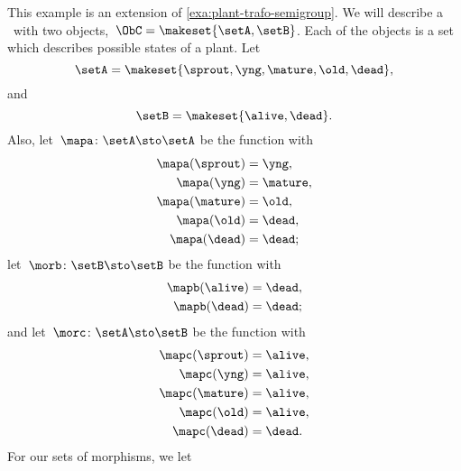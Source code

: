 \begin{example}
    \label{exa:semicat-plant-states}
    This example is an extension of \cref{exa:plant-trafo-semigroup}.
    We will describe a ~\CatC with two objects,~$\ObC = \makeset{ \setA, \setB }$.
    Each of the objects is a set which describes possible states of a plant.
    Let
    \begin{equation}
        \setA = \makeset{ \sprout, \yng, \mature, \old, \dead },
    \end{equation}
    and
    \begin{equation}
        \setB = \makeset{ \alive, \dead }.
    \end{equation}
    Also, let~$\mapa \colon \setA \sto \setA$ be the function with
    \begin{equation}
        \begin{aligned}
            \mapa(\sprout) & =  \yng, \\
            \mapa(\yng)    & =  \mature, \\
            \mapa(\mature) & =  \old, \\
            \mapa( \old)   & = \dead, \\
            \mapa(\dead)   & = \dead;
        \end{aligned}
    \end{equation}
    let~$\morb \colon \setB \sto \setB$ be the function with
    \begin{equation}
        \begin{aligned}
            \mapb(\alive) & =  \dead, \\
            \mapb(\dead)  & =  \dead;
        \end{aligned}
    \end{equation}
    and let~$\morc \colon \setA \sto \setB$ be the function with
    \begin{equation}
        \begin{aligned}
            \mapc(\sprout) & = \alive, \\
            \mapc(\yng)    & =  \alive, \\
            \mapc(\mature) & = \alive, \\
            \mapc( \old)   & = \alive, \\
            \mapc (\dead)  & = \dead.
        \end{aligned}
    \end{equation}
    For our sets of morphisms, we let
    \begin{equation}
        \begin{aligned}

\end{aligned}
\end{equation}
\end{example}
